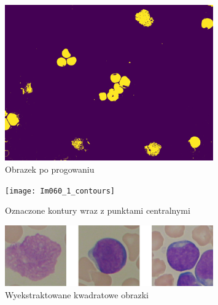 \begin{figure}
    \centering
    \includegraphics[width=0.8\textwidth]{Im060_1_thresh}
    \caption{Obrazek po progowaniu}
    \label{fig:extract_thresh}
\end{figure}

\begin{figure}
    \centering
    \texttt{[image: Im060\_1\_contours]}
    \caption{Oznaczone kontury wraz z punktami centralnymi}
    \label{fig:extract_contours}
\end{figure}

\begin{figure}
    \centering
    \includegraphics[width=0.8\textwidth]{cells}
    \caption{Wyekstraktowane kwadratowe obrazki}
    \label{fig:extract_squares}
\end{figure}

